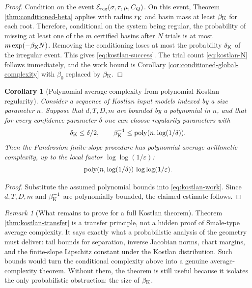 \documentclass[11pt]{article}
\newtheorem{corollary}[theorem]{Corollary}
\theoremstyle{definition}
\theoremstyle{remark}
\newtheorem{remark}[theorem]{Remark}
\begin{document}
\begin{proof}
Condition on the event $\mathcal E_{\rm reg}(\sigma,\tau,\mu,C_Q)$.  On this event, Theorem \ref{thm:conditioned-beta} applies with radius $r_{\rm K}$ and basin mass at least $\beta_{\rm K}$ for each root.  Therefore, conditional on the system being regular, the probability of missing at least one of the $m$ certified basins after $N$ trials is at most $m\exp(-\beta_{\rm K}N)$.  Removing the conditioning loses at most the probability $\delta_{\rm K}$ of the irregular event.  This gives \eqref{eq:kostlan-success}.  The trial count \eqref{eq:kostlan-N} follows immediately, and the work bound is Corollary \ref{cor:conditioned-global-complexity} with $\beta_0$ replaced by $\beta_{\rm K}$.
\end{proof}

\begin{corollary}[Polynomial average complexity from polynomial Kostlan regularity]\label{cor:poly-average}
Consider a sequence of Kostlan input models indexed by a size parameter $n$.  Suppose that $d,T,D,m$ are bounded by a polynomial in $n$, and that for every confidence parameter $\delta$ one can choose regularity parameters with
\[
        \delta_{\rm K}\leq \delta/2,
        \qquad
        \beta_{\rm K}^{-1}\leq {\rm poly}(n,\log(1/\delta)).
\]
Then the Pandrosion finite-slope procedure has polynomial average arithmetic complexity, up to the local factor $\log\log(1/\varepsilon)$:
\[
        {\rm poly}(n,\log(1/\delta))\,\log\log(1/\varepsilon).
\]
\end{corollary}

\begin{proof}
Substitute the assumed polynomial bounds into \eqref{eq:kostlan-work}.  Since $d,T,D,m$ and $\beta_{\rm K}^{-1}$ are polynomially bounded, the claimed estimate follows.
\end{proof}

\begin{remark}[What remains to prove for a full Kostlan theorem]
Theorem \ref{thm:kostlan-transfer} is a transfer principle, not a hidden proof of Smale-type average complexity.  It says exactly what a probabilistic analysis of the geometry must deliver: tail bounds for separation, inverse Jacobian norms, chart margins, and the finite-slope Lipschitz constant under the Kostlan distribution.  Such bounds would turn the conditional complexity above into a genuine average-complexity theorem.  Without them, the theorem is still useful because it isolates the only probabilistic obstruction: the size of $\beta_{\rm K}$.
\end{remark}
\end{document}
